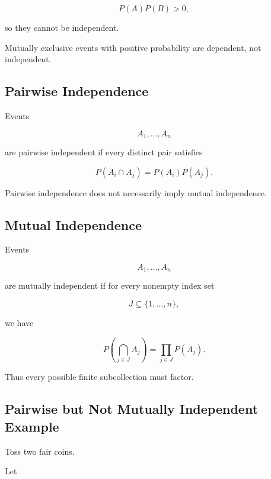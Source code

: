 \[
P(A)P(B)>0,
\]

so they cannot be independent.

\begin{warningbox}
Mutually exclusive events with positive probability are dependent, not
independent.
\end{warningbox}

\subsection{Pairwise Independence}
\label{subsec:pairwise-independence}

Events

\[
A_1,\ldots,A_n
\]

are pairwise independent if every distinct pair satisfies

\[
\boxed{
P(A_i\cap A_j)
=
P(A_i)P(A_j).
}
\]

Pairwise independence does not necessarily imply mutual independence.

\subsection{Mutual Independence}
\label{subsec:mutual-independence}

Events

\[
A_1,\ldots,A_n
\]

are mutually independent if for every nonempty index set

\[
J\subseteq\{1,\ldots,n\},
\]

we have

\[
\boxed{
P\left(
\bigcap_{j\in J}A_j
\right)
=
\prod_{j\in J}P(A_j).
}
\]

Thus every possible finite subcollection must factor.

\subsection{Pairwise but Not Mutually Independent Example}
\label{subsec:pairwise-not-mutual-example}

Toss two fair coins.

Let


